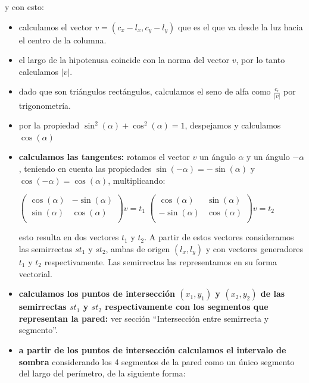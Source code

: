 y con esto:

\begin{itemize}
\item calculamos el vector $v = (c_x - l_x, c_y - l_y)$ que es el que va desde la luz hacia
el centro de la columna.
\item el largo de la hipotenusa coincide con la norma del vector $v$, por lo tanto calculamos $|v|$.
\item dado que son triángulos rectángulos, calculamos el seno de alfa como
$\displaystyle\frac{c_r}{|v|}$ por trigonometría.
\item por la propiedad $\sin^2(\alpha) + \cos^2(\alpha) = 1$, despejamos y calculamos $\cos(\alpha)$
\item \textbf{calculamos las tangentes:} rotamos el vector $v$ un ángulo $\alpha$ y un ángulo
$-\alpha$, teniendo en cuenta las propiedades $\sin(-\alpha) = -\sin(\alpha)$ y
$\cos(-\alpha) = \cos(\alpha)$, multiplicando:

\vspace{0.2cm}
\begin{center}
$\left(
\begin{array}{cc}
\cos(\alpha) & -\sin(\alpha) \\
\sin(\alpha) & \cos(\alpha) \\
\end{array}
\right)
v = t_1$
\hspace{1cm}
$\left(
\begin{array}{cc}
\cos(\alpha) & \sin(\alpha) \\
-\sin(\alpha) & \cos(\alpha) \\
\end{array}
\right)  
v = t_2$
\end{center}
\vspace{0.2cm}

esto resulta en dos vectores $t_1$ y $t_2$. A partir de estos vectores consideramos las semirrectas
$st_1$ y $st_2$, ambas de origen $(l_x, l_y)$ y con vectores generadores $t_1$ y $t_2$
respectivamente. Las semirrectas las representamos en su forma vectorial.
\item \textbf{calculamos los puntos de intersección $(x_1, y_1)$ y $(x_2, y_2)$ de las semirrectas
$st_1$ y $st_2$ respectivamente con los segmentos que representan la pared:} ver sección
``Intersección entre semirrecta y segmento''.
\item \textbf{a partir de los puntos de intersección calculamos el intervalo de sombra}
considerando los 4 segmentos de la pared como un único segmento del largo del perímetro,
de la siguiente forma:


\end{itemize}
